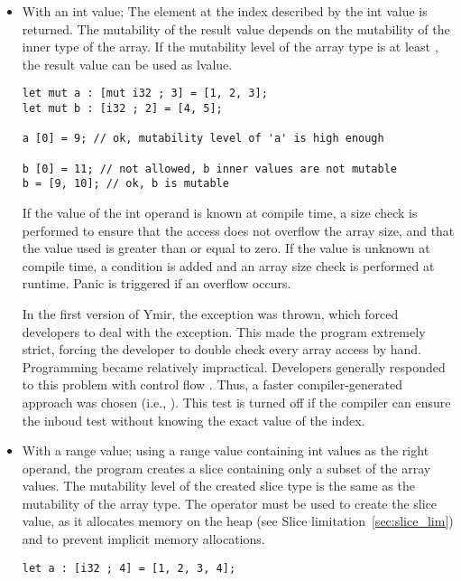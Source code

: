 \begin{itemize}
\item With an int value; The element at the index described by the int value is
  returned. The mutability of the result value depends on the mutability of the
  inner type of the array. If the mutability level of the array type is at least
  , the result value can be used as lvalue.

  \begin{lstlisting}[style=coloredverbatim]
let mut a : [mut i32 ; 3] = [1, 2, 3];
let mut b : [i32 ; 2] = [4, 5];

a [0] = 9; // ok, mutability level of 'a' is high enough

b [0] = 11; // not allowed, b inner values are not mutable
b = [9, 10]; // ok, b is mutable
  \end{lstlisting}

  If the value of the int operand is known at compile time, a size check is
  performed to ensure that the access does not overflow the array size, and that
  the value used is greater than or equal to zero. If the value is unknown at
  compile time, a condition is added and an array size check is performed at
  runtime. Panic is triggered if an overflow occurs.

  In the first version of Ymir, the exception
   was thrown, which forced developers to
  deal with the exception. This made the program extremely strict, forcing the
  developer to double check every array access by hand. Programming became
  relatively impractical. Developers generally responded to this problem with
  control flow . Thus, a faster
  compiler-generated approach was chosen (i.e., ). This
  test is turned off if the compiler can ensure the inboud test without knowing
  the exact value of the index.

\item With a range value; using a range value containing int values as the right
  operand, the program creates a slice containing only a subset of the array
  values. The mutability level of the created slice type is the same as the
  mutability of the array type. The  operator must be used to create
  the slice value, as it allocates memory on the heap (see Slice
  limitation~\ref{sec:slice_lim}) and to prevent implicit memory allocations.

  \begin{lstlisting}[style=coloredverbatim]
let a : [i32 ; 4] = [1, 2, 3, 4];


\end{lstlisting}
\end{itemize}
